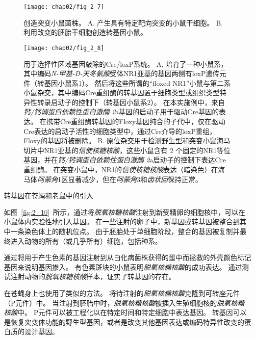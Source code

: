 \begin{figure}[htbp]
	\centering
	\texttt{[image: chap02/fig\_2\_7]}
	\caption{创造突变小鼠菌株\cite{alberts2017molecular}。
		A. 产生具有特定靶向突变的小鼠干细胞。
		B. 利用改变的胚胎干细胞创造转基因小鼠。}
	\label{fig:2_7}
\end{figure}


\begin{figure}[htbp]
	\centering
	\texttt{[image: chap02/fig\_2\_8]}
	\caption{用于选择性区域基因敲除的Cre/loxP系统。
		A. 培育了一种小鼠系，其中编码\textit{N-甲基-D-天冬氨酸}受体NR1亚基的基因两侧有loxP遗传元件（转基因小鼠系1）。
		然后将这些所谓的“floxed NR1”小鼠与第二系小鼠杂交，其中编码Cre重组酶的转基因置于细胞类型或组织类型特异性转录启动子的控制下（转基因小鼠系2）。
		在本实施例中，来自\textit{钙/钙调蛋白依赖性蛋白激酶 2}a基因的启动子用于驱动Cre基因的表达。
		在携带Cre重组酶转基因的Floxy基因纯合的子代中，仅在驱动Cre表达的启动子活性的细胞类型中，通过Cre介导的loxP重组，Floxy的基因将被删除。
		B. 原位杂交用于检测野生型和突变小鼠海马切片中NR1亚基的\textit{信使核糖核酸}，这些小鼠含有 2 个固定的NR1等位基因，并在\textit{钙/钙调蛋白依赖性蛋白激酶 2}a启动子的控制下表达Cre重组酶。
		在突变小鼠中，NR1的\textit{信使核糖核酸}表达（暗染色）在海马体\textit{阿蒙角}1区显著减少，但在\textit{阿蒙角}3和\textit{齿状回}保持正常\cite{tsien1996essential}。}
	\label{fig:2_8}
\end{figure}



\begin{proposition}[神经解剖学导航术语] \label{box:2_3}
	
	\quad \quad 转基因在苍蝇和老鼠中的引入
	
	\quad \quad 如图~\ref{fig:2_10}~所示，通过将\textit{脱氧核糖核酸}注射到新受精卵的细胞核中，可以在小鼠体内实验性地引入基因。
	在一些注射的卵子中，新基因或转基因被整合到其中一条染色体上的随机位点。
	由于胚胎处于单细胞阶段，整合的基因被复制并最终进入动物的所有（或几乎所有）细胞，包括种系。
	
	\quad \quad 通过将用于产生色素的基因注射到从白化病菌株获得的蛋中而拯救的外壳颜色标记基因来说明基因掺入。
	有色素斑块的小鼠表明\textit{脱氧核糖核酸}的成功表达。
	通过测试注射动物的\textit{脱氧核糖核酸}样本，证实了转基因的存在。
	
	\quad \quad 在苍蝇身上也使用了类似的方法。
	将待注射的\textit{脱氧核糖核酸}克隆到可转座元件（P元件）中。
	当注射到胚胎中时，\textit{脱氧核糖核酸}被插入生殖细胞核的\textit{脱氧核糖核酸}中。
	P元件可以被工程化以在特定时间和特定细胞中表达基因。
	转基因可以是恢复突变体功能的野生型基因，或者是改变其他基因表达或编码特异性改变的蛋白质的设计基因。
	
\end{proposition}


